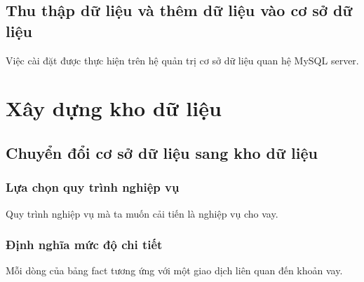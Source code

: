 \documentclass{article}
\begin{document}
\subsection{Thu thập dữ liệu và thêm dữ liệu vào cơ sở dữ liệu}
Việc cài đặt được thực hiện trên hệ quản trị cơ sở dữ liệu quan hệ MySQL server.

\section{Xây dựng kho dữ liệu}
\subsection{Chuyển đổi cơ sở dữ liệu sang kho dữ liệu}
\subsubsection{Lựa chọn quy trình nghiệp vụ}
Quy trình nghiệp vụ mà ta muốn cải tiến là nghiệp vụ cho vay.
\subsubsection{Định nghĩa mức độ chi tiết}
Mỗi dòng của bảng fact tương ứng với một giao dịch liên quan đến khoản vay.
\end{document}
